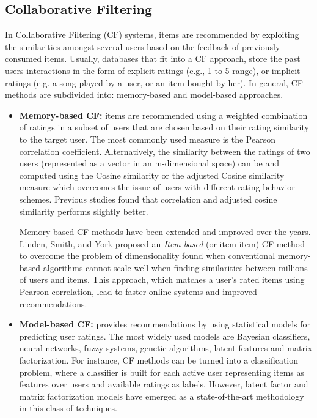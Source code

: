 \subsection{Collaborative Filtering} 

In Collaborative Filtering (CF) systems, items are recommended by exploiting the similarities amongst several users based on the feedback of previously consumed items. Usually, databases that fit into a CF approach, store the past users interactions in the form of explicit ratings (e.g., 1 to 5 range), or implicit ratings (e.g. a song played by a user, or an item bought by her). In general, CF methods are subdivided into: memory-based and model-based approaches.

\begin{itemize}
\item \textbf{Memory-based CF:} items are recommended using a weighted combination of ratings in a subset of users that are chosen based on their rating similarity to the target user. The most commonly used measure is the Pearson correlation coefficient\cite{resnick1994grouplens}.
Alternatively, the similarity between the ratings of two users (represented as a vector in an m-dimensional space) can be and computed using the Cosine similarity or the adjusted Cosine similarity measure which overcomes the issue of users with different rating behavior schemes\cite{yildirim2008random}. Previous studies found that correlation\cite{breese1998empirical} and adjusted cosine similarity\cite{yildirim2008random} performs slightly better.

Memory-based CF methods have been extended and improved over the years. Linden, Smith, and York\cite{linden2003amazon} proposed an \textit{Item-based} (or item-item) CF method to overcome the problem of dimensionality found when conventional memory-based algorithms cannot scale well when finding similarities between millions of users and items. This approach, which matches a user's rated items using Pearson correlation, lead to faster online systems and improved recommendations.

\item \textbf{Model-based CF:} provides recommendations by using statistical models for predicting user ratings. The most widely used models are Bayesian classifiers, neural networks, fuzzy systems, genetic algorithms, latent features and matrix factorization\cite{bobadilla2013recommender}. For instance, CF methods can be turned into a classification problem, where a classifier is built for each active user representing items as features over users and available ratings as labels. However, latent factor and matrix factorization models have emerged as a state-of-the-art methodology in this class of techniques\cite{koren2009matrix}.

\end{itemize}

